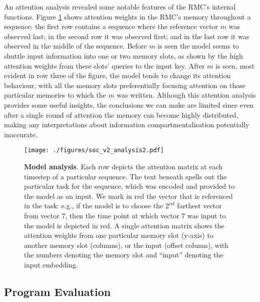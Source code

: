 \documentclass{article}
\begin{document}
An attention analysis revealed some notable features of the RMC's internal functions. Figure \ref{fig:analysis} shows attention weights in the RMC's memory throughout a sequence: the first row contains a sequence where the reference vector $m$ was observed last; in the second row it was observed first; and in the last row it was observed in the middle of the sequence. Before $m$ is seen the model seems to shuttle input information into one or two memory slots, as shown by the high attention weights from these slots' queries to the input key. After $m$ is seen, most evident in row three of the figure, the model tends to change its attention behaviour, with all the memory slots preferentially focusing attention on those particular memories to which the $m$ was written. Although this attention analysis provides some useful insights, the conclusions we can make are limited since even after a single round of attention the memory can become highly distributed, making any interpretations about information compartmentalisation potentially inaccurate.

\begin{figure}
    \centering
    \texttt{[image: ./figures/soc\_v2\_analysis2.pdf]}
    \caption{\textbf{Model analysis}. Each row depicts the attention matrix at each timestep of a particular sequence. The text beneath spells out the particular task for the sequence, which was encoded and provided to the model as an input. We mark in red the vector that is referenced in the task: e.g., if the model is to choose the $2^{nd}$ farthest vector from vector $7$, then the time point at which vector $7$ was input to the model is depicted in red. A single attention matrix shows the attention weights from one particular memory slot (y-axis) to another memory slot (columns), or the input (offset column), with the numbers denoting the memory slot and ``input'' denoting the input embedding.}
    \label{fig:analysis}
\end{figure}

\subsection{Program Evaluation}
\end{document}
